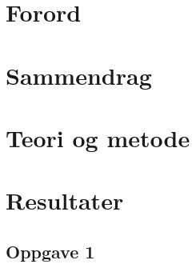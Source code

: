 \documentclass{article}
\begin{document}

\newpage


\section{Forord} %
\label{sec:forord}

\newpage



\section{Sammendrag} %
\label{sec:sammendrag}

\newpage


\label{sec:innholdsfortegnelse_og_figur_og_tabelliste}
\renewcommand{\contentsname}{Innholdsfortegnelse og figur- og tabelliste}
\tableofcontents
\newpage



\section{Teori og metode} %
\label{sec:teori}

\newpage

\newpage

\newpage


%


\section{Resultater} %
\label{sec:resultater}


\subsection{Oppgave 1} %
\label{sub:oppgave_1}

\newpage
\end{document}
